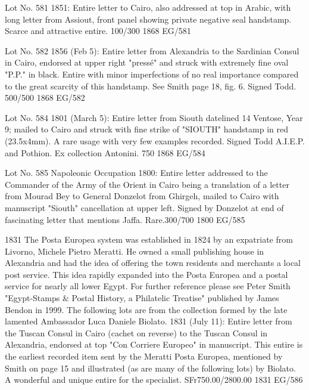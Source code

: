 \documentclass[justified]{tufte-book}
\begin{document}
%
{ Lot No. 581
1851: Entire letter to Cairo, also addressed at top in Arabic, with long letter from Assiout, front panel showing private negative seal handstamp. Scarce and attractive entire. 100/300}%
{1868}%
{EG/581}%
{}%
{}
{}%
{}

%
{Lot No. 582
1856 (Feb 5): Entire letter from Alexandria to the Sardinian Consul in Cairo, endorsed at upper right "pressé" and struck with extremely fine oval "P.P." in black. Entire with minor imperfections of no real importance compared to the great scarcity of this handstamp. See Smith page 18, fig. 6. Signed Todd. 500/500 }%
{1868}%
{EG/582}%
{}%
{}
{}%
{}



%
{Lot No. 584
1801 (March 5): Entire letter from Siouth datelined 14 Ventose, Year 9; mailed to Cairo and struck with fine strike of "SIOUTH" handstamp in red (23.5x4mm). A rare usage with very few examples recorded. Signed Todd A.I.E.P. and Pothion. Ex collection Antonini. 750 }%
{1868}%
{EG/584}%
{}%
{}
{}%
{}

%
{Lot No. 585
Napoleonic Occupation 1800: Entire letter addressed to the Commander of the Army of the Orient in Cairo being a translation of a letter from Mourad Bey to General Donzelot from Ghirgeh, mailed to Cairo with manuscript "Siouth" cancellation at upper left. Signed by Donzelot at end of fascinating letter that mentions Jaffa. Rare.300/700 
}%
{1800}%
{EG/585}%
{}%
{}
{}%
{}




%
{1831 The Posta Europea system was established in 1824 by an expatriate from Livorno, Michele Pietro Meratti. He owned a small publishing house in Alexandria and had the idea of offering the town residents and merchants a local post service. This idea rapidly expanded into the Posta Europea and a postal service for nearly all lower Egypt. For further reference please see Peter Smith "Egypt-Stamps \& Postal History, a Philatelic Treatise" published by James Bendon in 1999. The following lots are from the collection formed by the late lamented Ambassador Luca Daniele Biolato. 1831 (July 11): Entire letter from the Tuscan Consul in Cairo (cachet on reverse) to the Tuscan Consul in Alexandria, endorsed at top "Con Corriere Europeo" in manuscript. This entire is the earliest recorded item sent by the Meratti Posta Europea, mentioned by Smith on page 15 and illustrated (as are many of the following lots) by Biolato. A wonderful and unique entire for the specialist. SFr750.00/2800.00}%
{1831}%
{EG/586}%
{}%
{}
{}%
{}
\end{document}
